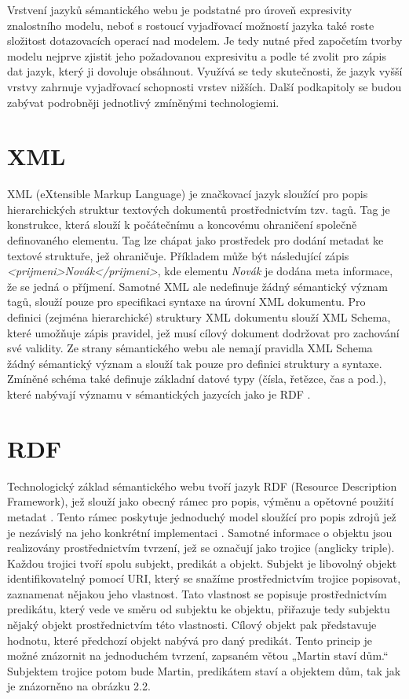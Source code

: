 \documentclass{projekt}
\begin{document}
Vrstvení jazyků sémantického webu je podstatné pro úroveň expresivity znalostního modelu, neboť s rostoucí vyjadřovací možností jazyka také roste složitost dotazovacích operací nad modelem. Je tedy nutné před započetím tvorby modelu nejprve zjistit jeho požadovanou expresivitu a podle té zvolit pro zápis dat jazyk, který ji dovoluje obsáhnout. Využívá se tedy skutečnosti, že jazyk vyšší vrstvy zahrnuje vyjadřovací schopnosti vrstev nižších\cite{_2}. 
Další podkapitoly se budou zabývat podrobněji jednotlivý zmíněnými technologiemi.

\section{XML}
\hspace{0.65cm}XML (eXtensible Markup Language) je značkovací jazyk sloužící pro popis hierarchických struktur textových dokumentů prostřednictvím tzv. tagů. Tag je konstrukce, která slouží k počátečnímu a koncovému ohraničení společně definovaného elementu. Tag lze chápat jako prostředek pro dodání metadat ke textové struktuře, jež ohraničuje. Příkladem může být následující zápis {\it <prijmeni>Novák</prijmeni>}, kde elementu {\it Novák} je dodána meta informace, že se jedná o příjmení. Samotné XML ale nedefinuje žádný sémantický význam tagů, slouží pouze pro specifikaci syntaxe na úrovní XML dokumentu. Pro definici (zejména hierarchické) struktury XML dokumentu slouží XML Schema, které umožňuje zápis pravidel, jež musí cílový dokument dodržovat pro zachování své validity. Ze strany sémantického webu ale nemají pravidla XML Schema žádný sémantický význam a slouží tak pouze pro definici struktury a syntaxe. Zmíněné schéma také definuje základní datové typy (čísla, řetězce, čas a pod.), které nabývají významu v sémantických jazycích jako je RDF \cite{_3}.


\section{RDF}
\hspace{0.65cm}Technologický základ sémantického webu tvoří jazyk RDF (Resource Description Framework), jež slouží jako obecný rámec pro popis, výměnu a opětovné použití metadat \cite{_3}. Tento rámec poskytuje jednoduchý model sloužící pro popis zdrojů jež je nezávislý na jeho konkrétní implementaci \cite{_4}. Samotné informace o objektu jsou realizovány prostřednictvím tvrzení, jež se označují jako trojice (anglicky triple). Každou trojici tvoří spolu subjekt, predikát a objekt. Subjekt je libovolný objekt identifikovatelný pomocí URI, který se snažíme prostřednictvím trojice popisovat, zaznamenat nějakou jeho vlastnost. Tato vlastnost se popisuje prostřednictvím predikátu, který vede ve směru od subjektu ke objektu, přiřazuje tedy subjektu nějaký objekt prostřednictvím této vlastnosti. Cílový objekt pak představuje hodnotu, které předchozí objekt nabývá pro daný predikát. 
Tento princip je možné znázornit na jednoduchém tvrzení, zapsaném větou „Martin staví dům.“ Subjektem trojice potom bude Martin, predikátem staví a objektem dům, tak jak je znázorněno na obrázku 2.2. 
\\
\vspace{0.1cm}
\end{document}
